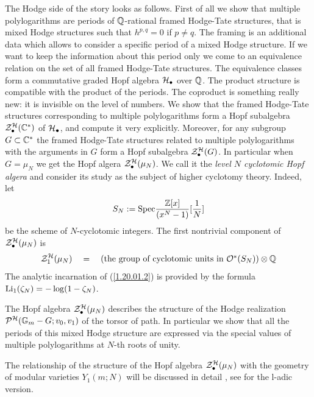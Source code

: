 \documentclass[10pt]{article}
\begin{document}
The Hodge side of the story looks as follows. 
First of all we show that multiple polylogarithms are periods of ${\mathbb Q}$-rational framed 
Hodge-Tate structures, that is 
 mixed Hodge structures such that $h^{p,q}=0$ if $p \not = q$. 
The framing is an additional data which allows  to consider  
a specific period of a mixed Hodge structure. If we want to keep the information 
about this period only we come to an  equivalence relation on the set of all framed 
Hodge-Tate structures. 
The equivalence classes form a commutative graded Hopf algebra ${\cal H}_{\bullet}$ 
over ${\mathbb Q}$. The product structure is compatible with the product of the periods. The coproduct 
is something really new: it is invisible on the level of numbers. 
We show that the framed Hodge-Tate structures corresponding to 
multiple polylogarithms form a Hopf subalgebra ${\cal Z}^{\cal H}_{\bullet}({\mathbb C}^*)$ of 
${\cal H}_{\bullet}$, and compute it very explicitly. 
Moreover, for any subgroup $G \subset {\mathbb C}^*$ the framed Hodge-Tate structures 
 related to multiple polylogarithms with the  arguments  in $G$ form a Hopf subalgebra  
${\cal Z}^{\cal H}_{\bullet}(G)$. In particular when $G = \mu_N$ we get the Hopf algera
${\cal Z}^{\cal H}_{\bullet}(\mu_N)$.  
We call it the {\it level $N$ cyclotomic Hopf algera} and  consider its study 
as the subject of higher cyclotomy theory. Indeed, let
$$
S_N:= {\rm Spec}\frac{{\mathbb Z}[x]}{(x^N-1)}[\frac{1}{N}]
$$
be the scheme of $N$-cyclotomic integers.
The   first  nontrivial component of 
 ${\cal Z}^{\cal H}_{\bullet}(\mu_N)$ is 
\begin{equation} \label{1.20.01.2}
{\cal Z}^{\cal H}_{1}(\mu_N) \quad = \quad (\mbox{the group of 
cyclotomic units in ${\cal O}^*(S_N) $}) \otimes {\mathbb Q}
\end{equation} 
The analytic incarnation of (\ref{1.20.01.2}) is provided by the 
formula ${\rm Li}_1(\zeta_N) = - \log (1-\zeta_N)$. 


The Hopf algebra ${\cal Z}^{\cal H}_{\bullet}(\mu_N)$ describes the 
structure of 
the Hodge realization ${\cal P}^{{\cal H}}({\mathbb G}_m - G; v_0, v_1)$ of the torsor of path.
In particular we show that all the periods of this mixed Hodge structure 
are expressed via the special values of multiple polylogarithms at $N$-th roots of unity. 

The relationship of the 
structure of the  Hopf algebra ${\cal Z}^{\cal H}_{\bullet}(\mu_N)$ 
with the geometry of modular varieties $Y_1(m;N)$ 
will be discussed in detail \cite{G10}, see \cite{G4} for the l-adic version. 
\end{document}
